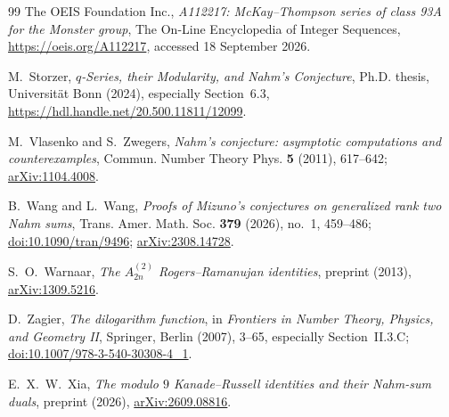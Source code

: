 \documentclass[11pt,reqno]{amsart}
\theoremstyle{remark}
\numberwithin{equation}{section}
\begin{document}
\begin{thebibliography}{99}
The OEIS Foundation Inc.,
\emph{A112217: McKay--Thompson series of class 93A for the Monster group},
The On-Line Encyclopedia of Integer Sequences,
\url{https://oeis.org/A112217}, accessed 18 September 2026.

M.~Storzer,
\emph{$q$-Series, their Modularity, and Nahm's Conjecture},
Ph.D. thesis, Universit\"at Bonn (2024), especially Section~6.3,
\url{https://hdl.handle.net/20.500.11811/12099}.

M.~Vlasenko and S.~Zwegers,
\emph{Nahm's conjecture: asymptotic computations and counterexamples},
Commun. Number Theory Phys. \textbf{5} (2011), 617--642;
\href{https://arxiv.org/abs/1104.4008}{arXiv:1104.4008}.

B.~Wang and L.~Wang,
\emph{Proofs of Mizuno's conjectures on generalized rank two Nahm sums},
Trans. Amer. Math. Soc. \textbf{379} (2026), no.~1, 459--486;
\href{https://doi.org/10.1090/tran/9496}{doi:10.1090/tran/9496};
\href{https://arxiv.org/abs/2308.14728}{arXiv:2308.14728}.

S.~O.~Warnaar,
\emph{The $A_{2n}^{(2)}$ Rogers--Ramanujan identities},
preprint (2013),
\href{https://arxiv.org/abs/1309.5216}{arXiv:1309.5216}.

D.~Zagier,
\emph{The dilogarithm function},
in \emph{Frontiers in Number Theory, Physics, and Geometry II},
Springer, Berlin (2007), 3--65, especially Section~II.3.C;
\href{https://doi.org/10.1007/978-3-540-30308-4_1}{doi:10.1007/978-3-540-30308-4\_1}.

E.~X.~W.~Xia,
\emph{The modulo $9$ Kanade--Russell identities and their Nahm-sum duals},
preprint (2026),
\href{https://arxiv.org/abs/2609.08816}{arXiv:2609.08816}.
\end{thebibliography}
\end{document}
